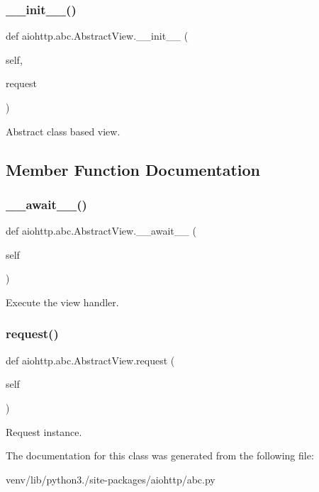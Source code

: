 \subsubsection{\texorpdfstring{\+\_\+\+\_\+init\+\_\+\+\_\+()}{\_\_init\_\_()}}
{\footnotesize\ttfamily def aiohttp.\+abc.\+Abstract\+View.\+\_\+\+\_\+init\+\_\+\+\_\+ (\begin{DoxyParamCaption}\item[{}]{self,  }\item[{}]{request }\end{DoxyParamCaption})}

\begin{DoxyVerb}Abstract class based view.\end{DoxyVerb}
 

\subsection{Member Function Documentation}
\mbox{\label{classaiohttp_1_1abc_1_1_abstract_view_ad770ab0cdd9b7518f96b0ee2073e0713}} 
\subsubsection{\texorpdfstring{\+\_\+\+\_\+await\+\_\+\+\_\+()}{\_\_await\_\_()}}
{\footnotesize\ttfamily def aiohttp.\+abc.\+Abstract\+View.\+\_\+\+\_\+await\+\_\+\+\_\+ (\begin{DoxyParamCaption}\item[{}]{self }\end{DoxyParamCaption})}

\begin{DoxyVerb}Execute the view handler.\end{DoxyVerb}
 \mbox{\label{classaiohttp_1_1abc_1_1_abstract_view_a2750f8b41cbe35442bd91c3824362e4e}} 
\subsubsection{\texorpdfstring{request()}{request()}}
{\footnotesize\ttfamily def aiohttp.\+abc.\+Abstract\+View.\+request (\begin{DoxyParamCaption}\item[{}]{self }\end{DoxyParamCaption})}

\begin{DoxyVerb}Request instance.\end{DoxyVerb}
 

The documentation for this class was generated from the following file\+:\begin{DoxyCompactItemize}
\item 
venv/lib/python3./site-\/packages/aiohttp/abc.\+py\end{DoxyCompactItemize}
